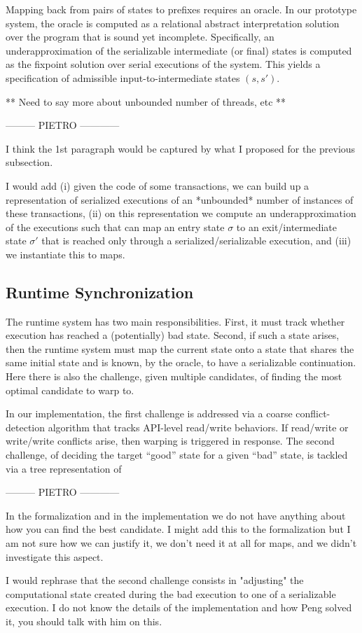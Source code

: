 Mapping back from pairs of states to prefixes requires an oracle. In our prototype system, the oracle is computed as a relational abstract interpretation solution over the program that is sound yet incomplete. Specifically, an underapproximation of the serializable intermediate (or final) states is computed as the fixpoint solution over serial executions of the system. This yields a specification of admissible input-to-intermediate states $(s,s')$.

** Need to say more about unbounded number of threads, etc **


--------- PIETRO ------------

I think the 1st paragraph would be captured by what I proposed for the previous subsection. 

I would add (i) given the code of some transactions, we can build up a representation of serialized executions of an *unbounded* number of instances of these transactions, (ii) on this representation we compute an underapproximation of the executions such that can map an entry state $\sigma$ to an exit/intermediate state $\sigma'$ that is reached only through a serialized/serializable execution, and (iii) we instantiate this to maps.

\subsection{Runtime Synchronization} 

The runtime system has two main responsibilities. First, it must track whether execution has reached a (potentially) bad state. Second, if such a state arises, then the runtime system must map the current state onto a state that shares the same initial state and is known, by the oracle, to have a serializable continuation. Here there is also the challenge, given multiple candidates, of finding the most optimal candidate to warp to.

In our implementation, the first challenge is addressed via a coarse conflict-detection algorithm that tracks API-level read/write behaviors. If read/write or write/write conflicts arise, then warping is triggered in response. The second challenge, of deciding the target ``good'' state for a given ``bad'' state, is tackled via a tree representation of 


--------- PIETRO ------------

In the formalization and in the implementation we do not have anything about how you can find the best candidate. I might add this to the formalization but I am not sure how we can justify it, we don't need it at all for maps, and we didn't investigate this aspect.

I would rephrase that the second challenge consists in "adjusting" the computational state created during the bad execution to one of a serializable execution. I do not know the details of the implementation and how Peng solved it, you should talk with him on this.
